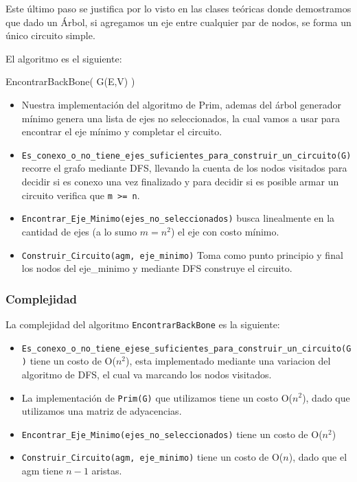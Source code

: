 Este último paso se justifica por lo visto en las clases teóricas donde demostramos que dado un Árbol, si agregamos un eje entre cualquier par de nodos, se forma un único circuito simple.

El algoritmo es el siguiente:

\begin{algorithm}
\begin{algorithmic}[1]\parskip=1mm
\caption{EncontrarBackBone( G(E,V) ) }
	\STATE{}
 \end{algorithmic}
\end{algorithm}

\begin{itemize}
	\item Nuestra implementación del algoritmo de Prim, ademas del árbol generador mínimo genera una lista de ejes no seleccionados, la cual vamos a usar para encontrar el eje mínimo y completar el circuito.
	\item \verb+Es_conexo_o_no_tiene_ejes_suficientes_para_construir_un_circuito(G)+ recorre el grafo mediante DFS, llevando la cuenta de los nodos visitados para decidir si es conexo una vez finalizado y para decidir si es posible armar un circuito verifica que \verb+m >= n+.
	\item \verb+Encontrar_Eje_Minimo(ejes_no_seleccionados)+ busca linealmente en la cantidad de ejes (a lo sumo $m = n^2$) el eje con costo mínimo.
	\item \verb+Construir_Circuito(agm, eje_minimo)+ Toma como punto principio y final los nodos del eje_minimo y mediante DFS construye el circuito.
\end{itemize}

\subsubsection{Complejidad}

La complejidad del algoritmo \verb+EncontrarBackBone+  es la siguiente: 

\begin{itemize}
	\item \verb+Es_conexo_o_no_tiene_ejese_suficientes_para_construir_un_circuito(G)+ tiene un costo de O($n^2$), esta implementado mediante una variacion del algoritmo de DFS, el cual va marcando los nodos visitados.
	\item La implementación de \verb+Prim(G)+ que utilizamos tiene un costo O($n^2$), dado que utilizamos una matriz de adyacencias.
	\item \verb+Encontrar_Eje_Minimo(ejes_no_seleccionados)+ tiene un costo de O($n^2$)
	\item \verb+Construir_Circuito(agm, eje_minimo)+ tiene un costo de O($n$), dado que el agm tiene $n-1$ aristas.
\end{itemize}

